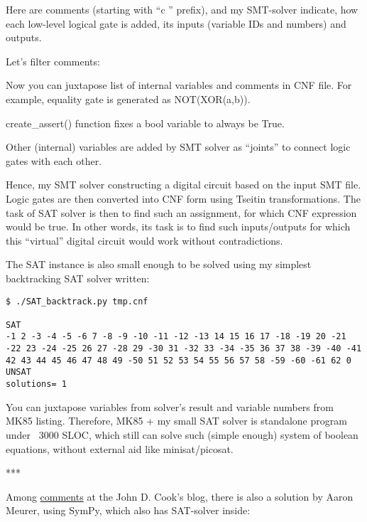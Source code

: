 Here are comments (starting with ``c '' prefix), and my SMT-solver indicate, how each low-level logical gate is added,
its inputs (variable IDs and numbers) and outputs.

Let's filter comments:



Now you can juxtapose list of internal variables and comments in CNF file.
For example, equality gate is generated as NOT(XOR(a,b)).

create\_assert() function fixes a bool variable to always be True.

Other (internal) variables are added by SMT solver as ``joints'' to connect logic gates with each other.

Hence, my SMT solver constructing a digital circuit based on the input SMT file.
Logic gates are then converted into CNF form using Tseitin transformations.
The task of SAT solver is then to find such an assignment, for which CNF expression would be true.
In other words, its task is to find such inputs/outputs for which this ``virtual'' digital circuit would work
without contradictions.

The SAT instance is also small enough to be solved using my simplest backtracking SAT solver written:

\begin{lstlisting}
$ ./SAT_backtrack.py tmp.cnf

SAT
-1 2 -3 -4 -5 -6 7 -8 -9 -10 -11 -12 -13 14 15 16 17 -18 -19 20 -21 -22 23 -24 -25 26 27 -28 29 -30 31 -32 33 -34 -35 36 37 38 -39 -40 -41 42 43 44 45 46 47 48 49 -50 51 52 53 54 55 56 57 58 -59 -60 -61 62 0
UNSAT
solutions= 1
\end{lstlisting}

You can juxtapose variables from solver's result and variable numbers from MK85 listing.
Therefore, MK85 + my small SAT solver is standalone program under ~3000 SLOC, which still can solve such (simple enough) system of boolean equations, without external aid like minisat/picosat.

***

Among \href{https://www.johndcook.com/blog/2015/07/06/multiple-choice/}{comments} at the John D. Cook's blog, there is also a solution by Aaron Meurer, using SymPy,
which also has SAT-solver inside:

